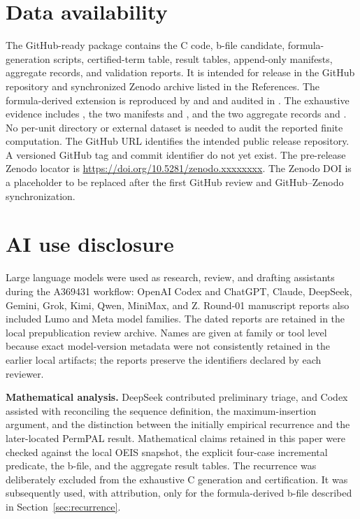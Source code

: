 \documentclass[11pt]{article}
\theoremstyle{definition}
\theoremstyle{remark}
\begin{document}
\section*{Data availability}
\begin{sloppypar}

The GitHub-ready package contains the C code, b-file candidate,
formula-generation scripts, certified-term table, result tables, append-only
manifests, aggregate records, and validation reports.  It is intended for
release in the GitHub repository and synchronized Zenodo archive listed in the
References.  The formula-derived extension is reproduced by
 and  and
audited in
.  The exhaustive
evidence includes , the two manifests
 and
, and the two aggregate records
 and
.  No per-unit directory or external
dataset is needed to audit the reported finite computation.  The GitHub URL
identifies the intended public release repository.  A versioned GitHub tag and
commit identifier do not yet exist.  The pre-release Zenodo locator is
\url{https://doi.org/10.5281/zenodo.xxxxxxxx}.
The Zenodo DOI is a placeholder to be replaced after the first GitHub review
and GitHub--Zenodo synchronization.
\end{sloppypar}

\section*{AI use disclosure}

Large language models were used as research, review, and drafting assistants
during the A369431 workflow: OpenAI Codex and ChatGPT, Claude, DeepSeek,
Gemini, Grok, Kimi, Qwen, MiniMax, and Z.  Round-01 manuscript reports also
included Lumo and Meta model families.  The dated reports are retained in the
local prepublication review archive.  Names are given at family or tool level
because exact model-version metadata were not consistently retained in the
earlier local artifacts; the reports preserve the identifiers declared by
each reviewer.

\noindent\textbf{Mathematical analysis.}
DeepSeek contributed preliminary triage, and Codex assisted with reconciling
the sequence definition, the maximum-insertion argument, and the distinction
between the initially empirical recurrence and the later-located PermPAL
result.  Mathematical
claims retained in this paper were checked against the local OEIS snapshot,
the explicit four-case incremental predicate, the b-file, and the aggregate
result tables.  The recurrence was deliberately excluded from the exhaustive
C generation and certification.  It was subsequently used, with attribution,
only for the formula-derived b-file described in
Section~\ref{sec:recurrence}.
\end{document}
